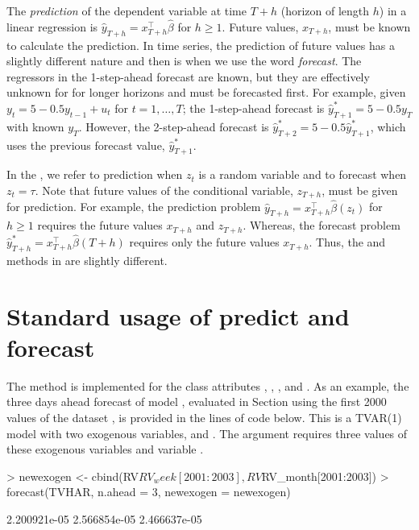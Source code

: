 The \emph{prediction} of the dependent variable at time $T+h$ (horizon of length $h$) in a linear regression is $\hat y_{T+h} = x_{T+h}^\top \hat \beta$ for $h\ge 1$. Future values, $x_{T+h}$, must be known to calculate the prediction. In time series, the prediction of future values has a slightly different nature and then is when we use the word \emph{forecast}. The regressors in the 1-step-ahead forecast are known, but they are effectively unknown for for longer horizons and must be forecasted first. For example, given $y_t = 5 - 0.5 y_{t-1} + u_t$ for $t = 1, \ldots, T$; the 1-step-ahead forecast is $\hat y_{T+1}^* = 5 -0.5 y_{T}$ with known $y_T$. However, the 2-step-ahead forecast is $\hat y_{T+2}^* = 5 - 0.5 \hat y_{T+1}^*$, which uses the previous forecast value, $\hat y_{T+1}^*$. 

In the , we refer to prediction when $z_t$ is a random variable and to forecast when $z_t = \tau$. Note that future values of the conditional variable, $z_{T+h}$, must be given for prediction. For example, the prediction problem $\hat y_{T+h} = x_{T+h}^\top \hat \beta(z_t)$ for $h\ge 1$ requires the future values $x_{T+h}$ and $z_{T+h}$. Whereas, the forecast problem $\hat y_{T+h}^* = x_{T+h}^\top \hat \beta(T+h)$ requires only the future values $x_{T+h}$. Thus, the  and  methods in  are slightly different. 


\section{Standard usage of predict and forecast}

The  method is implemented for the class attributes , , ,  and . As an example, the three days ahead forecast of model , evaluated in Section  using the first 2000 values of the dataset , is provided in the lines of code below. This is a TVAR(1) model with two exogenous variables,  and . The argument  requires three values of these exogenous variables and variable . 

\begin{Schunk}
\begin{Sinput}
> newexogen <- cbind(RV$RV_week[2001:2003], RV$RV_month[2001:2003])
> forecast(TVHAR, n.ahead = 3, newexogen = newexogen)
\end{Sinput}
\begin{Soutput}
[1] 2.200921e-05 2.566854e-05 2.466637e-05
\end{Soutput}
\end{Schunk}


